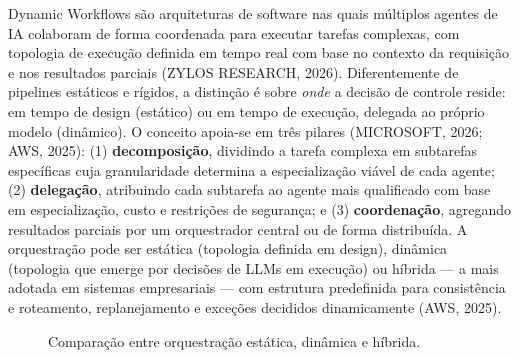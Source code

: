 \documentclass[12pt,a4paper]{article}
\begin{document}
Dynamic Workflows são arquiteturas de software nas quais múltiplos agentes de IA colaboram de forma coordenada para executar tarefas complexas, com topologia de execução definida em tempo real com base no contexto da requisição e nos resultados parciais (ZYLOS RESEARCH, 2026). Diferentemente de pipelines estáticos e rígidos, a distinção é sobre \textit{onde} a decisão de controle reside: em tempo de design (estático) ou em tempo de execução, delegada ao próprio modelo (dinâmico). O conceito apoia-se em três pilares (MICROSOFT, 2026; AWS, 2025): (1) \textbf{decomposição}, dividindo a tarefa complexa em subtarefas específicas cuja granularidade determina a especialização viável de cada agente; (2) \textbf{delegação}, atribuindo cada subtarefa ao agente mais qualificado com base em especialização, custo e restrições de segurança; e (3) \textbf{coordenação}, agregando resultados parciais por um orquestrador central ou de forma distribuída. A orquestração pode ser estática (topologia definida em design), dinâmica (topologia que emerge por decisões de LLMs em execução) ou híbrida — a mais adotada em sistemas empresariais — com estrutura predefinida para consistência e roteamento, replanejamento e exceções decididos dinamicamente (AWS, 2025).
\begin{figure}[htbp]
\centering
{}
\caption{Comparação entre orquestração estática, dinâmica e híbrida.}
\end{figure}
\end{document}
